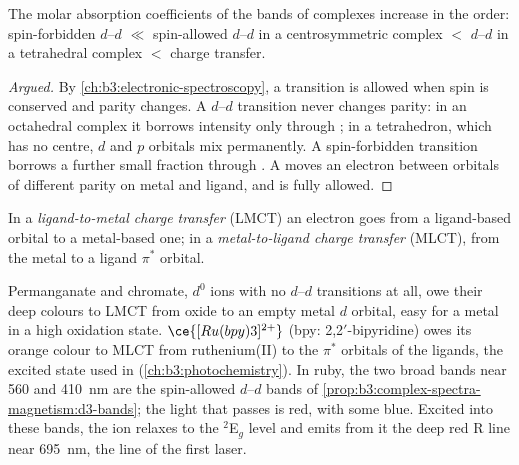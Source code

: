\begin{proposition}\label{prop:b3:complex-spectra-magnetism:intensity-order}
The molar absorption coefficients of the bands of complexes increase in the
order: spin-forbidden $d$--$d$ $\ll$ spin-allowed $d$--$d$ in a centrosymmetric complex $<$ $d$--$d$
in a tetrahedral complex $<$ charge transfer.
\end{proposition}

\begin{proof}[Argued]
By \cref{ch:b3:electronic-spectroscopy}, a transition is allowed when spin is
conserved and parity changes. A $d$--$d$ transition never changes parity: in an
octahedral complex it borrows intensity only through ; in a
tetrahedron, which has no centre, $d$ and $p$ orbitals mix permanently. A
spin-forbidden transition borrows a further small fraction through . A  moves an electron between orbitals of
different parity on metal and ligand, and is fully allowed.
\end{proof}

\begin{definition}\label{def:b3:complex-spectra-magnetism:ct}
In a \emph{ligand-to-metal charge transfer}
(LMCT) an electron goes from a ligand-based orbital to a metal-based
one; in a \emph{metal-to-ligand charge transfer}
(MLCT), from the metal to a ligand $\pi^*$ orbital.
\end{definition}

Permanganate and chromate, $d^0$ ions with no $d$--$d$ transitions at all, owe their deep
colours to LMCT from oxide to an empty metal $d$ orbital, easy for a metal in a high
oxidation state. $\ce{[Ru(bpy)3]^{2+}}$ (bpy: 2,2$'$-bipyridine) owes its orange colour to MLCT
from ruthenium(II) to the $\pi^*$ orbitals of the ligands, the excited state used in
 (\cref{ch:b3:photochemistry}). In ruby, the two broad bands
near 560 and \qty{410}{nm} are the spin-allowed $d$--$d$ bands of
\cref{prop:b3:complex-spectra-magnetism:d3-bands}; the light that passes is red,
with some blue. Excited into these bands, the ion relaxes to the $^2$E$_g$ level and
emits from it the deep red R line near \qty{695}{nm}, the line of the first laser.

